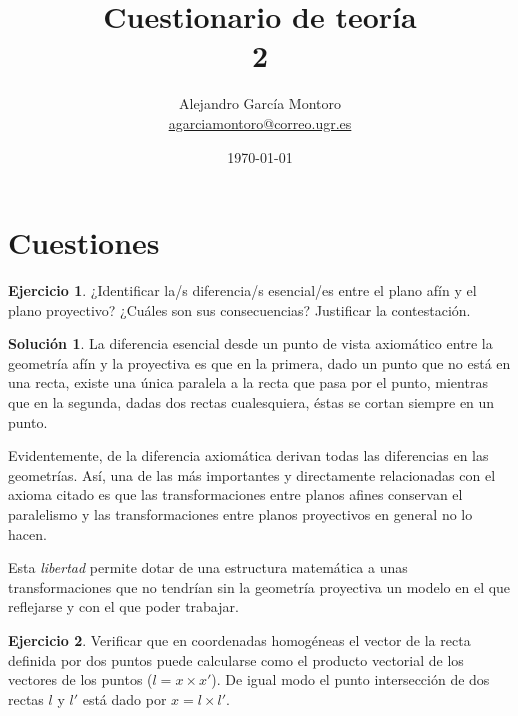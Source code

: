 \documentclass[a4paper, 11pt]{article}
\title{Cuestionario de teoría \\ 2}
\author{Alejandro García Montoro\\
    \href{mailto:agarciamontoro@correo.ugr.es}{agarciamontoro@correo.ugr.es}}
\date{\today}
\theoremstyle{definition}
\newtheorem{ejercicio}{Ejercicio}
\newtheorem*{solucion}{Solución}
\theoremstyle{theorem}
\begin{document}
  \maketitle

  \section{Cuestiones}

  \begin{ejercicio}
      ¿Identificar la/s diferencia/s esencial/es entre el plano afín y el plano proyectivo? ¿Cuáles son sus consecuencias? Justificar la contestación.
  \end{ejercicio}

  \begin{solucion}
      La diferencia esencial desde un punto de vista axiomático entre la geometría afín y la proyectiva es que en la primera, dado un punto que no está en una recta, existe una única paralela a la recta que pasa por el punto, mientras que en la segunda, dadas dos rectas cualesquiera, éstas se cortan siempre en un punto.

      Evidentemente, de la diferencia axiomática derivan todas las diferencias en las geometrías. Así, una de las más importantes y directamente relacionadas con el axioma citado es que las transformaciones entre planos afines conservan el paralelismo y las transformaciones entre planos proyectivos en general no lo hacen.

      Esta \emph{libertad} permite dotar de una estructura matemática a unas transformaciones que no tendrían sin la geometría proyectiva un modelo en el que reflejarse y con el que poder trabajar.
  \end{solucion}

  \begin{ejercicio}
      Verificar que en coordenadas homogéneas el vector de la recta definida por dos puntos puede calcularse como el producto vectorial de los vectores de los puntos ($l = x \times x'$). De igual modo el punto intersección de dos rectas $l$ y $l'$ está dado por $x = l \times l'$.
  \end{ejercicio}
\end{document}

